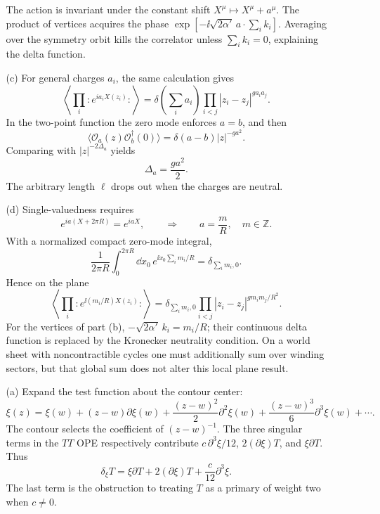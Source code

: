 \begin{enumerate}
\begin{enumerate}
    The action is invariant under the constant shift
    \(X^\mu\mapsto X^\mu+a^\mu\).  The product of vertices acquires the
    phase
    \(\exp[-\ii\sqrt{2\alpha'}\,a\cdot\sum_i k_i]\).
    Averaging over the symmetry orbit kills the correlator unless
    \(\sum_i k_i=0\), explaining the delta function.

    \item[(c)]
    For general charges \(a_i\), the same calculation gives
    \[
      \left\langle\prod_i:\!e^{ia_iX(z_i)}\!:\right\rangle
      =
      \delta\!\left(\sum_i a_i\right)
      \prod_{i<j}|z_i-z_j|^{g a_i a_j}.
      \tag{20.4.S4}
    \]
    In the two-point function the zero mode enforces \(a=b\), and then
    \[
      \langle\mathcal O_a(z)\mathcal O_b^\dagger(0)\rangle
        =\delta(a-b)|z|^{-ga^2}.
    \]
    Comparing with \(|z|^{-2\Delta_a}\) yields
    \[
      \boxed{\Delta_a=\frac{ga^2}{2}.}
    \]
    The arbitrary length \(\ell\) drops out when the charges are neutral.

    \item[(d)]
    Single-valuedness requires
    \[
      e^{ia(X+2\pi R)}=e^{iaX},
      \qquad\Longrightarrow\qquad
      \boxed{a=\frac{m}{R},\quad m\in\mathbb Z.}
    \]
    With a normalized compact zero-mode integral,
    \[
      \frac{1}{2\pi R}\int_0^{2\pi R}\dd x_0\,
       e^{\ii x_0\sum_i m_i/R}
       =\delta_{\sum_i m_i,0}.
    \]
    Hence on the plane
    \[
      \boxed{
      \left\langle\prod_i
        :e^{\ii(m_i/R)X(z_i)}:
      \right\rangle
      =
      \delta_{\sum_i m_i,0}
      \prod_{i<j}|z_i-z_j|^{g m_i m_j/R^2}.}
    \]
    For the vertices of part (b),
    \(-\sqrt{2\alpha'}\,k_i=m_i/R\); their continuous delta function is
    replaced by the Kronecker neutrality condition.  On a world sheet
    with noncontractible cycles one must additionally sum over winding
    sectors, but that global sum does not alter this local plane result.
  \end{enumerate}

  \begin{enumerate}
    \item[(a)]
    Expand the test function about the contour center:
    \[
      \xi(z)=\xi(w)+(z-w)\partial\xi(w)
       +\frac{(z-w)^2}{2}\partial^2\xi(w)
       +\frac{(z-w)^3}{6}\partial^3\xi(w)+\cdots .
    \]
    The contour selects the coefficient of \((z-w)^{-1}\).  The three
    singular terms in the \(TT\) OPE respectively contribute
    \(c\,\partial^3\xi/12\), \(2(\partial\xi)T\), and
    \(\xi\partial T\).  Thus
    \[
      \boxed{\delta_\xi T
        =\xi\partial T+2(\partial\xi)T
          +\frac{c}{12}\partial^3\xi.}
    \]
    The last term is the obstruction to treating \(T\) as a primary of
    weight two when \(c\neq0\).


\end{enumerate}
\end{enumerate}
